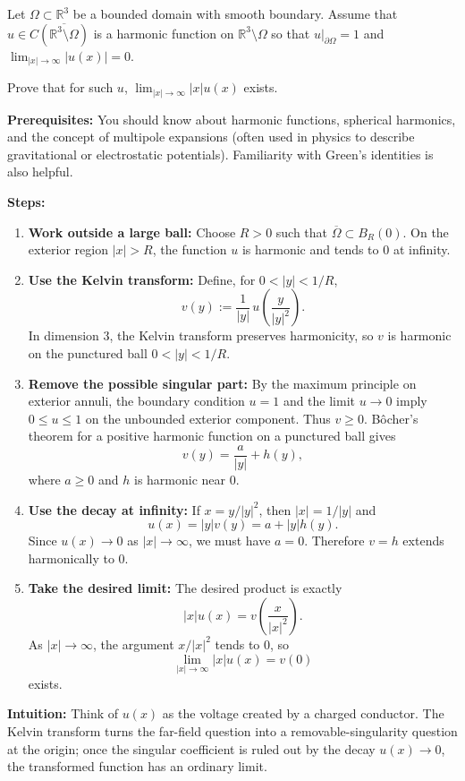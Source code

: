 \begin{exercise}
\label{analysis:2022:5}
Let $\Omega\subset\mathbb{R}^3$ be a bounded domain with smooth boundary. Assume that $u\in C(\overline{\mathbb{R}^3\setminus\Omega})$ is a harmonic function on $\mathbb{R}^3\setminus\Omega$ so that $u|_{\partial\Omega}=1$ and $\lim_{|x|\to\infty}|u(x)|=0$.

Prove that for such $u$, $\lim_{|x|\to\infty}|x|u(x)$ exists.
\end{exercise}

\begin{solution}
\textbf{Prerequisites:}
You should know about harmonic functions, spherical harmonics, and the concept of multipole expansions (often used in physics to describe gravitational or electrostatic potentials). Familiarity with Green's identities is also helpful.


\textbf{Steps:}
\begin{enumerate}
    \item \textbf{Work outside a large ball:} Choose $R>0$ such that $\overline{\Omega}\subset B_R(0)$. On the exterior region $|x|>R$, the function $u$ is harmonic and tends to $0$ at infinity.

    \item \textbf{Use the Kelvin transform:} Define, for $0<|y|<1/R$,
    \[
    v(y):=\frac{1}{|y|}\,
    u\left(\frac{y}{|y|^2}\right).
    \]
    In dimension $3$, the Kelvin transform preserves harmonicity, so $v$ is harmonic on the punctured ball $0<|y|<1/R$.

    \item \textbf{Remove the possible singular part:} By the maximum principle on exterior annuli, the boundary condition $u=1$ and the limit $u\to0$ imply $0\leq u\leq1$ on the unbounded exterior component. Thus $v\geq0$. Bôcher's theorem for a positive harmonic function on a punctured ball gives
    \[
    v(y)=\frac{a}{|y|}+h(y),
    \]
    where $a\geq0$ and $h$ is harmonic near $0$.

    \item \textbf{Use the decay at infinity:} If $x=y/|y|^2$, then $|x|=1/|y|$ and
    \[
    u(x)=|y|v(y)=a+|y|h(y).
    \]
    Since $u(x)\to0$ as $|x|\to\infty$, we must have $a=0$. Therefore $v=h$ extends harmonically to $0$.

    \item \textbf{Take the desired limit:} The desired product is exactly
    \[
    |x|u(x)=v\left(\frac{x}{|x|^2}\right).
    \]
    As $|x|\to\infty$, the argument $x/|x|^2$ tends to $0$, so
    \[
    \lim_{|x|\to\infty}|x|u(x)=v(0)
    \]
    exists.
\end{enumerate}


\textbf{Intuition:}
Think of $u(x)$ as the voltage created by a charged conductor. The Kelvin transform turns the far-field question into a removable-singularity question at the origin; once the singular coefficient is ruled out by the decay $u(x)\to0$, the transformed function has an ordinary limit.
\end{solution}

